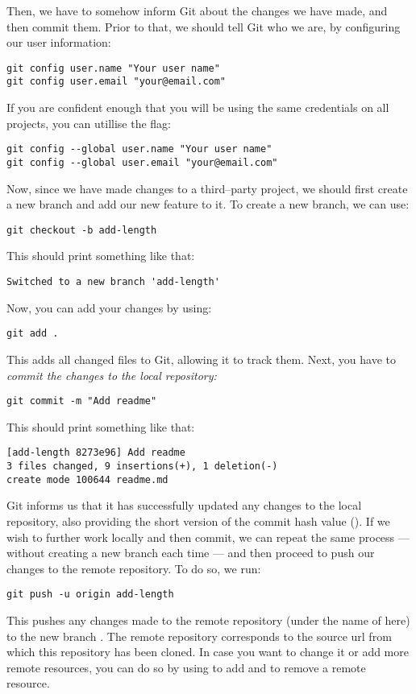\documentclass[a4paper, 11pt]{article}
\numberwithin{equation}{section}
\theoremstyle{definition}
\begin{document}
	
	
	Then, we have to somehow inform Git about the changes we have made, and then commit them. Prior to that, we should tell Git who we are, by configuring our user information:
	\begin{lstlisting}
git config user.name "Your user name"
git config user.email "your@email.com"\end{lstlisting}
	If you are confident enough that you will be using the same credentials on all projects, you can utillise the  flag:
	\begin{lstlisting}
git config --global user.name "Your user name"
git config --global user.email "your@email.com"\end{lstlisting}

	Now, since we have made changes to a third--party project, we should first create a new branch and add our new feature to it. To create a new branch, we can use:
	\begin{lstlisting}
git checkout -b add-length\end{lstlisting}
	This should print something like that:
	\begin{lstlisting}
Switched to a new branch 'add-length'\end{lstlisting}
	Now, you can add your changes by using:
	\begin{lstlisting}
git add .\end{lstlisting}
	This adds all changed files to Git, allowing it to track them. Next, you have to \emph{commit the changes to the local repository:}
	\begin{lstlisting}
git commit -m "Add readme"\end{lstlisting}
	This should print something like that:
	\begin{lstlisting}
[add-length 8273e96] Add readme
3 files changed, 9 insertions(+), 1 deletion(-)
create mode 100644 readme.md\end{lstlisting}
	Git informs us that it has successfully updated any changes to the local repository, also providing the short version of the commit hash value (). If we wish to further work locally and then commit, we can repeat the same process --- without creating a new branch each time --- and then proceed to push our changes to the remote repository. To do so, we run:
	\begin{lstlisting}
git push -u origin add-length\end{lstlisting}
	This pushes any changes made to the remote repository (under the name of  here) to the new branch . The remote repository  corresponds to the source url from which this repository has been cloned. In case you want to change it or add more remote resources, you can do so by using  to add and  to remove a remote resource.
\end{document}
